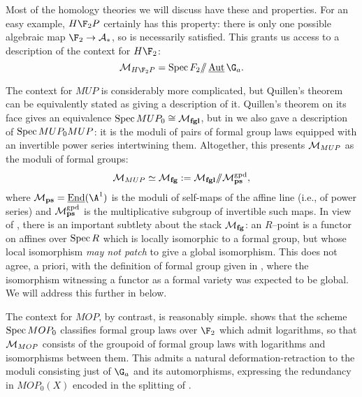 \begin{example}
Most of the homology theories we will discuss have these {\CH} and {\FH} properties.  For an easy example, $H\F_2P$ certainly has this property: there is only one possible algebraic map $\F_2 \to \mathcal A_*$, so {\FH} is necessarily satisfied.  This grants us access to a description of the context for $H\F_2$: \[\context{H\F_2P} = \Spec F_2 \mmod \InternalAut{\G_a}.\]
\end{example}

\begin{example}\label{ContextOfMUPExample}
The context for $MUP$ is considerably more complicated, but Quillen's theorem can be equivalently stated as giving a description of it.  Quillen's theorem on its face gives an equivalence $\operatorname{Spec} MUP_0 \cong \mathcal{M}_{\mathbf{fgl}}$, but in  we also gave a description of $\operatorname{Spec} MUP_0 MUP$: it is the moduli of pairs of formal group laws equipped with an invertible power series intertwining them.  Altogether, this presents $\mathcal{M}_{MUP}$ as the moduli of formal groups: \[\mathcal{M}_{MUP} \simeq \mathcal{M}_{\mathbf{fg}} := \mathcal{M}_{\mathbf{fgl}} /\!\!/ \mathcal{M}_{\mathbf{ps}}^{\mathrm{gpd}},\] where $\moduli{ps} = \InternalEnd(\A^1)$ is the moduli of self-maps of the affine line (i.e., of power series) and $\mathcal{M}_{\mathbf{ps}}^{\mathrm{gpd}}$ is the multiplicative subgroup of invertible such maps.  In view of , there is an important subtlety about the stack $\mathcal{M}_{\mathbf{fg}}$: an $R$--point is a functor on affines over $\operatorname{Spec} R$ which is locally isomorphic to a formal group, but whose local isomorphism \emph{may not patch} to give a global isomorphism.  This does not agree, a priori, with the definition of formal group given in , where the isomorphism witnessing a functor as a formal variety was expected to be global.  We will address this further in  below.
\end{example}

\begin{example}\label{ContextOfMOPExample}
The context for $MOP$, by contrast, is reasonably simple.   shows that the scheme $\operatorname{Spec} MOP_0$ classifies formal group laws over $\F_2$ which admit logarithms, so that $\mathcal{M}_{MOP}$ consists of the groupoid of formal group laws with logarithms and isomorphisms between them.  This admits a natural deformation-retraction to the moduli consisting just of $\G_a$ and its automorphisms, expressing the redundancy in $MOP_0(X)$ encoded in the splitting of .
\end{example}

